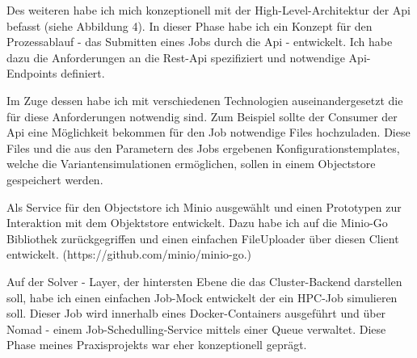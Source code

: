 \documentclass[12pt]{article}
\begin{document}
\bigbreak
Des weiteren habe ich mich konzeptionell mit der High-Level-Architektur der Api befasst (siehe Abbildung 4). In dieser Phase habe ich ein Konzept für den Prozessablauf - das Submitten eines Jobs durch die Api - entwickelt. Ich habe dazu die Anforderungen an die Rest-Api spezifiziert und notwendige Api-Endpoints definiert.

Im Zuge dessen habe ich mit verschiedenen Technologien auseinandergesetzt die für diese Anforderungen notwendig sind. Zum Beispiel sollte der Consumer der Api eine Möglichkeit bekommen für den Job notwendige Files hochzuladen. Diese Files und die aus den Parametern des Jobs ergebenen Konfigurationstemplates, welche die Variantensimulationen ermöglichen, sollen in einem Objectstore gespeichert werden.

Als Service für den Objectstore ich Minio ausgewählt und einen Prototypen zur Interaktion mit dem Objektstore entwickelt. Dazu habe ich auf die Minio-Go Bibliothek zurückgegriffen und einen einfachen FileUploader über diesen Client entwickelt. (https://github.com/minio/minio-go.)

Auf der Solver - Layer, der hintersten Ebene die das Cluster-Backend darstellen soll, habe ich einen einfachen Job-Mock entwickelt der ein HPC-Job simulieren soll. Dieser Job wird innerhalb eines Docker-Containers ausgeführt und über Nomad - einem Job-Schedulling-Service mittels einer Queue verwaltet. Diese Phase meines Praxisprojekts war eher konzeptionell geprägt.
\end{document}
